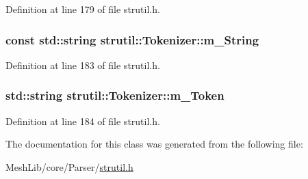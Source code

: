 Definition at line 179 of file strutil.\+h.

\subsubsection[{\texorpdfstring{m\+\_\+\+String}{m_String}}]{\setlength{\rightskip}{0pt plus 5cm}const std\+::string strutil\+::\+Tokenizer\+::m\+\_\+\+String\hspace{0.3cm}{\ttfamily [protected]}}\hypertarget{classstrutil_1_1_tokenizer_a61e86d8e56aeec3fd927423501a03e8b}{}\label{classstrutil_1_1_tokenizer_a61e86d8e56aeec3fd927423501a03e8b}


Definition at line 183 of file strutil.\+h.

\subsubsection[{\texorpdfstring{m\+\_\+\+Token}{m_Token}}]{\setlength{\rightskip}{0pt plus 5cm}std\+::string strutil\+::\+Tokenizer\+::m\+\_\+\+Token\hspace{0.3cm}{\ttfamily [protected]}}\hypertarget{classstrutil_1_1_tokenizer_a51b24fd77541f9731a8599f61d92bf43}{}\label{classstrutil_1_1_tokenizer_a51b24fd77541f9731a8599f61d92bf43}


Definition at line 184 of file strutil.\+h.



The documentation for this class was generated from the following file\+:\begin{DoxyCompactItemize}
\item 
Mesh\+Lib/core/\+Parser/\hyperlink{strutil_8h}{strutil.\+h}\end{DoxyCompactItemize}
